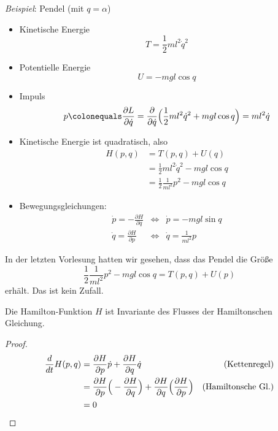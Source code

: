 \emph{Beispiel}: Pendel (mit $q = \alpha$)
\begin{itemize}
\item Kinetische Energie
  \begin{equation*}
    T = \frac12 m l^2 \dot q^2
  \end{equation*}
\item Potentielle Energie
  \begin{equation*}
    U = -mgl \cos q
  \end{equation*}

\item Impuls
  \begin{equation*}
    p
    \colonequals \frac{\partial L}{\partial\dot q}
    = \frac{\partial}{\partial\dot q}\Big( \frac12 m l^2 \dot q^2 + mgl \cos q \Big)
    = m l^2 \dot q
  \end{equation*}
\item Kinetische Energie ist quadratisch, also
  \begin{align*}
    H(p, q)
    & = T(p, q) + U(q) \\
    & = \frac12 m l^2 \dot q^2 - m g l \cos q \\
    & = \frac12 \frac{1}{m l^2} p^2 - m g l \cos q
  \end{align*}
\item Bewegungsgleichungen:
  \begin{eqnarray*}
    \dot p = -\frac{\partial H}{\partial q} & \Leftrightarrow & \dot p = - m g l \sin q \\
    \dot q = \frac{\partial H}{\partial p} & \Leftrightarrow & \dot q = \frac{1}{m l^2} p
  \end{eqnarray*}
\end{itemize}

In der letzten Vorlesung hatten wir gesehen, dass das Pendel die Größe
\begin{equation*}
  \frac12 \frac{1}{ml^2} p^2 - mgl \cos q = T(p, q) + U(p)
\end{equation*}
erhält.
Das ist kein Zufall.

\begin{satz}
  Die Hamilton-Funktion $H$ ist Invariante des Flusses der Hamiltonschen Gleichung.
\end{satz}

\begin{proof}
  \begin{align*}
    \frac{d}{dt} H(p, q)
    & = \frac{\partial H}{\partial p} \dot p + \frac{\partial H}{\partial q} \dot q & \text{(Kettenregel)} \\
    & = \frac{\partial H}{\partial p} \Big(-\frac{\partial H}{\partial q}\Big)
      + \frac{\partial H}{\partial q} \Big(\frac{\partial H}{\partial p}\Big) & \text{(Hamiltonsche Gl.)} \\
    & = 0 \qedhere
  \end{align*}
\end{proof}


